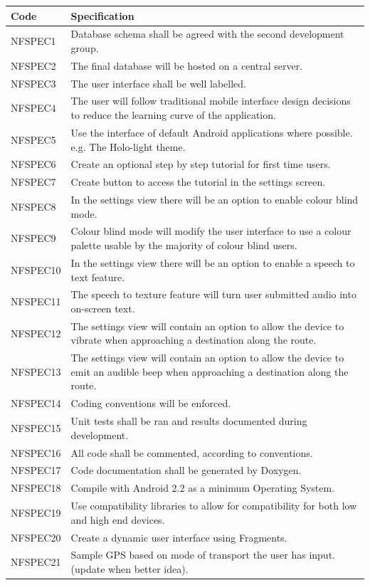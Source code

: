 \documentclass[11pt,a4paper]{article}
\begin{document}
\begin{longtable}{|p{2.5cm}p{13cm}|}
\hline
\textbf{Code} & \textbf{Specification} \\

\hline
NFSPEC1 & Database schema shall be agreed with the second development group. \\ \hline
NFSPEC2 & The final database will be hosted on a central server. \\ \hline
NFSPEC3 & The user interface shall be well labelled. \\ \hline
NFSPEC4 & The user will follow traditional mobile interface design decisions to reduce the learning curve of the application. \\ \hline
NFSPEC5 & Use the interface of default Android applications where possible. e.g. The Holo-light theme. \\ \hline
NFSPEC6 & Create an optional step by step tutorial for first time users. \\ \hline
NFSPEC7 & Create button to access the tutorial in the settings screen. \\ \hline
NFSPEC8 & In the settings view there will be an option to enable colour blind mode. \\ \hline
NFSPEC9 & Colour blind mode will modify the user interface to use a colour palette usable by the majority of colour blind users. \\ \hline
NFSPEC10 & In the settings view there will be an option to enable a speech to text feature. \\ \hline
NFSPEC11 & The speech to texture feature will turn user submitted audio into on-screen text. \\ \hline
NFSPEC12 & The settings view will contain an option to allow the device to vibrate when approaching a destination along the route. \\ \hline
NFSPEC13 & The settings view will contain an option to allow the device to emit an audible beep when approaching a destination along the route. \\ \hline
NFSPEC14 & Coding conventions will be enforced. \\ \hline
NFSPEC15 & Unit tests shall be ran and results documented during development. \\ \hline
NFSPEC16 & All code shall be commented, according to conventions. \\ \hline
NFSPEC17 & Code documentation shall be generated by Doxygen. \\ \hline
NFSPEC18 & Compile with Android 2.2 as a minimum Operating System. \\ \hline
NFSPEC19 & Use compatibility libraries to allow for compatibility for both low and high end devices. \\ \hline
NFSPEC20 & Create a dynamic user interface using Fragments. \\ \hline
NFSPEC21 & Sample GPS based on mode of transport the user has input. (update when better idea). \\ \hline
\end{longtable}
\end{document}
